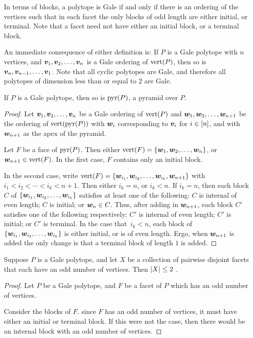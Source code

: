 In terms of blocks, a polytope is Gale if and only if there is an ordering of the vertices such that in each facet the only blocks of odd length are either initial, or terminal.  Note that a facet need not have either an initial block, or a terminal block.

An immediate consequence of either definition is:  If \(P\) is a Gale polytope with \(n\) vertices, and \(\bm{v}_1, \bm{v}_2,\dotsc, \bm{v}_n\) is a Gale ordering of \(\operatorname{vert}(P)\), then so is \(\bm{v}_n, \bm{v}_{n-1},\dotsc, \bm{v}_1\).  Note that all cyclic polytopes are Gale, and therefore all polytopes of dimension less than or equal to \(2\) are Gale.

\begin{Theorem}
    If \(P\) is a Gale polytope, then so is \(\operatorname{pyr}(P)\), a pyramid over \(P\).
\end{Theorem}
\begin{proof}
    Let \(\bm{v}_1, \bm{v}_2,\dotsc,\bm{v}_n\) be a Gale ordering of \(\operatorname{vert}(P)\) and \(\bm{w}_1, \bm{w}_2,\dotsc,\bm{w}_{n+1}\) be the ordering of \(\operatorname{vert}(\operatorname{pyr}(P))\) with \(\bm{w}_i\) corresponding to \(\bm{v}_i\) for \(i\in\left[n\right]\), and with \(\bm{w}_{n+1}\) as the apex of the pyramid.

    Let \(F\) be a face of \(\operatorname{pyr}(P)\).  Then either \(\operatorname{vert}(F)=\left\{\bm{w}_1,\bm{w}_2,\dotsc,\bm{w}_n\right\}\), or \(\bm{w}_{n+1}\in \operatorname{vert}(F)\).  In the first case, \(F\) contains only an initial block.

    In the second case, write \(\operatorname{vert}(F)=\left\{\bm{w}_{i_1},\bm{w}_{i_2},\dotsc,\bm{w}_{i_k},\bm{w}_{n+1}\right\}\) with \(i_1<i_2<\dotsb<i_k<n+1\).  Then either \(i_k=n\), or \(i_k<n\).  If \(i_k=n\), then each block \(C\) of \(\left\{\bm{w}_{i_1},\bm{w}_{i_2},\dotsc,\bm{w}_{i_k}\right\}\) satisfies at least one of the following: \(C\) is internal of even length; \(C\) is initial; or \(\bm{w}_n\in C\).  Thus, after adding in \(\bm{w}_{n+1}\), each block \(C'\) satisfies one of the following respectively: \(C'\) is internal of even length; \(C'\) is initial; or \(C'\) is terminal.  In the case that\ \(i_k<n\), each block of \(\left\{\bm{w}_{i_1},\bm{w}_{i_2},\dotsc,\bm{w}_{i_k}\right\}\) is either initial, or is of even length.  Ergo, when \(\bm{w}_{n+1}\) is added the only change is that a terminal block of length \(1\) is added.
\end{proof}

\begin{Theorem}
    Suppose \(P\) is a Gale polytope, and let \(X\) be a collection of pairwise disjoint facets that each have an odd number of vertices.  Then \(\left\lvert X\right\rvert\le 2\) .
\end{Theorem}
\begin{proof}
    Let \(P\) be a Gale polytope, and \(F\) be a facet of \(P\) which has an odd number of vertices.

    Consider the blocks of \(F\). since \(F\) has an odd number of vertices, it must have either an initial or terminal block.  If this were not the case, then there would be an internal block with an odd number of vertices.
\end{proof}


